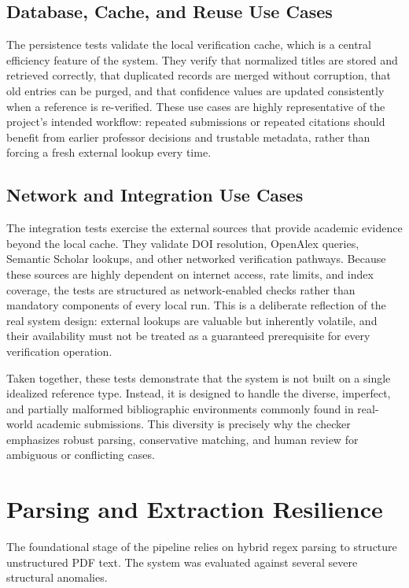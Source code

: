 \documentclass[12pt,a4paper,oneside]{report}
\begin{document}
\subsection{Database, Cache, and Reuse Use Cases}
The persistence tests validate the local verification cache, which is a central efficiency feature of the system. They verify that normalized titles are stored and retrieved correctly, that duplicated records are merged without corruption, that old entries can be purged, and that confidence values are updated consistently when a reference is re-verified. These use cases are highly representative of the project's intended workflow: repeated submissions or repeated citations should benefit from earlier professor decisions and trustable metadata, rather than forcing a fresh external lookup every time.

\subsection{Network and Integration Use Cases}
The integration tests exercise the external sources that provide academic evidence beyond the local cache. They validate DOI resolution, OpenAlex queries, Semantic Scholar lookups, and other networked verification pathways. Because these sources are highly dependent on internet access, rate limits, and index coverage, the tests are structured as network-enabled checks rather than mandatory components of every local run. This is a deliberate reflection of the real system design: external lookups are valuable but inherently volatile, and their availability must not be treated as a guaranteed prerequisite for every verification operation.

Taken together, these tests demonstrate that the system is not built on a single idealized reference type. Instead, it is designed to handle the diverse, imperfect, and partially malformed bibliographic environments commonly found in real-world academic submissions. This diversity is precisely why the checker emphasizes robust parsing, conservative matching, and human review for ambiguous or conflicting cases.

\section{Parsing and Extraction Resilience}

The foundational stage of the pipeline relies on hybrid regex parsing to structure unstructured PDF text. The system was evaluated against several severe structural anomalies.
\end{document}
